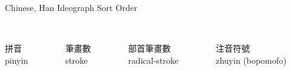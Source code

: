 \documentclass[aspectratio=169,10pt]{beamer}
\begin{document}
\begin{frame}[fragile]{Chinese, Han Ideograph Sort Order}

\begin{columns}

\begin{column}{38mm}
\begin{center}
\\[2mm]%
拼音\\
pinyin
\end{center}
\end{column}

\begin{column}{38mm}
\begin{center}
\\[2mm]%
筆畫數\\
stroke
\end{center}
\end{column}

\begin{column}{38mm}
\begin{center}
\\[2mm]%
部首筆畫數\\
radical-stroke
\end{center}
\end{column}

\begin{column}{38mm}
\begin{center}
\\[2mm]%
注音符號\\
zhuyin (bopomofo)
\end{center}
\end{column}
\end{columns}

\end{frame}

\end{document}
